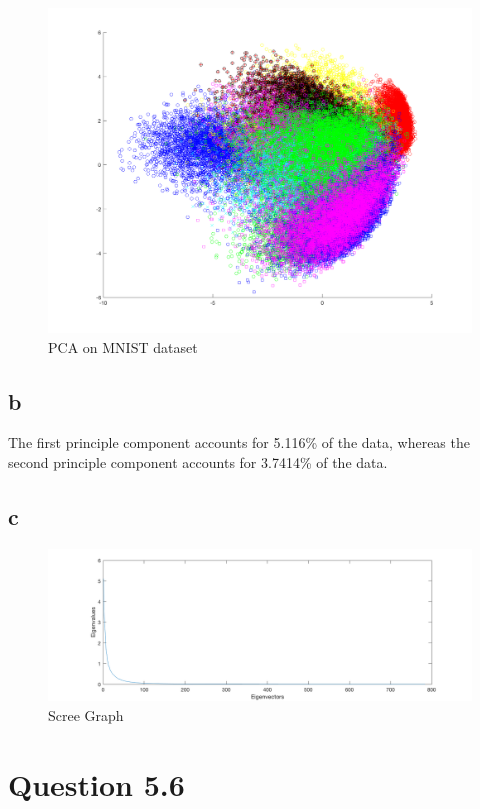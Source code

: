 \begin{figure}[H]
    \includegraphics[width=\linewidth]{../../pracs/week6/images/q2_pca}
    \centering
    \caption{PCA on MNIST dataset}
\end{figure}

\subsection*{b}

The first principle component accounts for 5.116\% of the data, whereas the second principle component accounts for 3.7414\% of the data.

\subsection*{c}

\begin{figure}[H]
    \includegraphics[width=\linewidth]{../../pracs/week6/images/scree_graph}
    \centering
    \caption{Scree Graph}
\end{figure}

\section*{Question 5.6}

